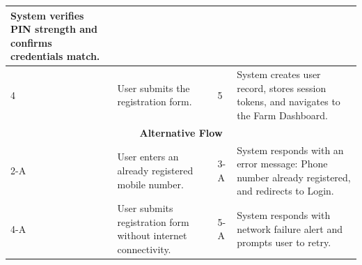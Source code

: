\documentclass{FastFyp}
\begin{document}
\begin{table}[!ht]
\begin{tabular}{|lllll|}
  \multicolumn{1}{p{5.6cm}|}{System verifies PIN strength and confirms credentials match.} \\ \hline
\multicolumn{1}{|p{0.8cm}|}{4} &
  \multicolumn{2}{p{6.0cm}|}{User submits the registration form.} &
  \multicolumn{1}{p{0.8cm}|}{5} &
  \multicolumn{1}{p{5.6cm}|}{System creates user record, stores session tokens, and navigates to the Farm Dashboard.} \\ \hline
\multicolumn{5}{|c|}{\textbf{Alternative Flow}} \\ \hline
\multicolumn{1}{|p{0.8cm}|}{2-A} &
  \multicolumn{2}{p{6.0cm}|}{User enters an already registered mobile number.} &
  \multicolumn{1}{p{0.8cm}|}{3-A} &
  \multicolumn{1}{p{5.6cm}|}{System responds with an error message: Phone number already registered, and redirects to Login.} \\ \hline
\multicolumn{1}{|p{0.8cm}|}{4-A} &
  \multicolumn{2}{p{6.0cm}|}{User submits registration form without internet connectivity.} &
  \multicolumn{1}{p{0.8cm}|}{5-A} &
  \multicolumn{1}{p{5.6cm}|}{System responds with network failure alert and prompts user to retry.} \\ \hline
\end{tabular}
\end{table}
\end{document}
